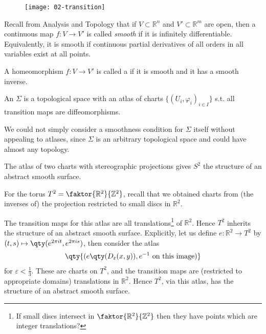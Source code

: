 \begin{figure}[h] 
    \centering 
    \texttt{[image: 02-transition]} 
\end{figure}

Recall from Analysis and Topology that if $V \subset \mathbb R^n$ and $V' \subset \mathbb R^m$ are open, then a continuous map $f \colon V \to V'$ is called \textit{smooth} if it is infinitely differentiable.
Equivalently, it is smooth if continuous partial derivatives of all orders in all variables exist at all points.

\begin{definition}[Diffeomorphism]
	A homeomorphism $f : V \to V'$ is called a  if it is smooth and it has a smooth inverse.
\end{definition} 

\begin{definition}
	An  $\Sigma$ is a topological space with an atlas of charts $\{(U_i, \varphi_i)_{i \in I}\}$ s.t. all transition maps are diffeomorphisms.
\end{definition}

\begin{remark}
	We could not simply consider a smoothness condition for $\Sigma$ itself without appealing to atlases, since $\Sigma$ is an arbitrary topological space and could have almost any topology.
\end{remark}

\begin{example}
	The atlas of two charts with stereographic projections gives $S^2$ the structure of an abstract smooth surface.
\end{example}

\begin{example}
	For the torus $T^2 = \faktor{\mathbb R^2}{\mathbb Z^2}$, recall that we obtained charts from (the inverses of) the projection restricted to small discs in $\mathbb{R}^2$.

	The transition maps for this atlas are all translations\footnote{If small discs intersect in $\faktor{\mathbb R^2}{\mathbb Z^2}$ then they have points which are integer translations?} of $\mathbb R^2$.
	Hence $T^2$ inherits the structure of an abstract smooth surface.
	Explicitly, let us define $e \colon \mathbb R^2 \to T^2$ by $(t,s) \mapsto \qty(e^{2\pi i t}, e^{2 \pi i s})$, then consider the atlas
	\begin{align*}
		\qty{(e\qty(D_\varepsilon(x,y)), e^{-1} \text{ on this image})}
	\end{align*}
	for $\varepsilon < \frac{1}{3}$.
	These are charts on $T^2$, and the transition maps are (restricted to appropriate domains) translations in $\mathbb R^2$.
	Hence $T^2$, via this atlas, has the structure of an abstract smooth surface.
\end{example}

